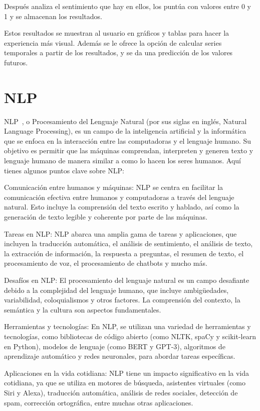 Después analiza el sentimiento que hay en ellos, los puntúa con valores entre 0 y 1 y se almacenan los resultados.

Estos resultados se muestran al usuario en gráficos y tablas para hacer la experiencia más visual. Además se le ofrece la opción de calcular series temporales a partir de los resultados, y se da una predicción de los valores futuros.


\section{NLP}
NLP~\cite{nlp1}, o Procesamiento del Lenguaje Natural (por sus siglas en inglés, Natural Language Processing), es un campo de la inteligencia artificial y la informática que se enfoca en la interacción entre las computadoras y el lenguaje humano. Su objetivo es permitir que las máquinas comprendan, interpreten y generen texto y lenguaje humano de manera similar a como lo hacen los seres humanos. Aquí tienes algunos puntos clave sobre NLP:

Comunicación entre humanos y máquinas: NLP se centra en facilitar la comunicación efectiva entre humanos y computadoras a través del lenguaje natural. Esto incluye la comprensión del texto escrito y hablado, así como la generación de texto legible y coherente por parte de las máquinas.

Tareas en NLP: NLP abarca una amplia gama de tareas y aplicaciones, que incluyen la traducción automática, el análisis de sentimiento, el análisis de texto, la extracción de información, la respuesta a preguntas, el resumen de texto, el procesamiento de voz, el procesamiento de chatbots y mucho más.

Desafíos en NLP: El procesamiento del lenguaje natural es un campo desafiante debido a la complejidad del lenguaje humano, que incluye ambigüedades, variabilidad, coloquialismos y otros factores. La comprensión del contexto, la semántica y la cultura son aspectos fundamentales.

Herramientas y tecnologías: En NLP, se utilizan una variedad de herramientas y tecnologías, como bibliotecas de código abierto (como NLTK, spaCy y scikit-learn en Python), modelos de lenguaje (como BERT y GPT-3), algoritmos de aprendizaje automático y redes neuronales, para abordar tareas específicas.

Aplicaciones en la vida cotidiana: NLP tiene un impacto significativo en la vida cotidiana, ya que se utiliza en motores de búsqueda, asistentes virtuales (como Siri y Alexa), traducción automática, análisis de redes sociales, detección de spam, corrección ortográfica, entre muchas otras aplicaciones.

